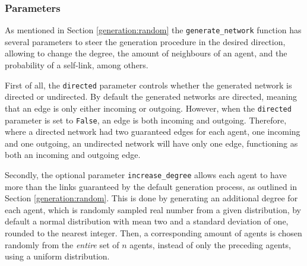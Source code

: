 \documentclass[a4paper, 12pt]{report}
\begin{document}
\subsubsection{Parameters}

As mentioned in Section \ref{generation:random} the \texttt{generate\_network} function has several parameters to steer the generation procedure in the desired direction, allowing to change the degree, the amount of neighbours of an agent, and the probability of a self-link, among others. 

\noindent First of all, the \texttt{directed} parameter controls whether the generated network is directed or undirected. By default the generated networks are directed, meaning that an edge is only either incoming or outgoing. However, when the \texttt{directed} parameter is set to \texttt{False}, an edge is both incoming and outgoing. Therefore, where a directed network had two guaranteed edges for each agent, one incoming and one outgoing, an undirected network will have only one edge, functioning as both an incoming and outgoing edge.

\noindent Secondly, the optional parameter \texttt{increase\_degree} allows each agent to have more than the links guaranteed by the default generation process, as outlined in Section \ref{generation:random}. This is done by generating an additional degree for each agent, which is randomly sampled real number from a given distribution, by default a normal distribution with mean two and a standard deviation of one, rounded to the nearest integer. Then, a corresponding amount of agents is chosen randomly from the \emph{entire} set of $n$ agents, instead of only the preceding agents, using a uniform distribution.
\end{document}
